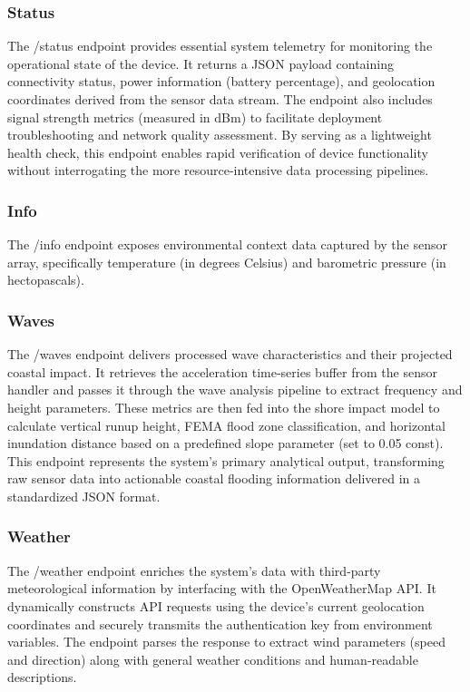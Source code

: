 \documentclass{article}
\begin{document}
    \subsubsection{Status}
    The /status endpoint provides essential system telemetry for monitoring the operational state of the device. It returns a JSON payload containing connectivity status, power information (battery percentage), and geolocation coordinates derived from the sensor data stream. The endpoint also includes signal strength metrics (measured in dBm) to facilitate deployment troubleshooting and network quality assessment. By serving as a lightweight health check, this endpoint enables rapid verification of device functionality without interrogating the more resource-intensive data processing pipelines.

    \subsubsection{Info}
    The /info endpoint exposes environmental context data captured by the sensor array, specifically temperature (in degrees Celsius) and barometric pressure (in hectopascals).

    \subsubsection{Waves}
    The /waves endpoint delivers processed wave characteristics and their projected coastal impact. It retrieves the acceleration time-series buffer from the sensor handler and passes it through the wave analysis pipeline to extract frequency and height parameters. These metrics are then fed into the shore impact model to calculate vertical runup height, FEMA flood zone classification, and horizontal inundation distance based on a predefined slope parameter (set to 0.05 const). This endpoint represents the system's primary analytical output, transforming raw sensor data into actionable coastal flooding information delivered in a standardized JSON format.

    \subsubsection{Weather}
    The /weather endpoint enriches the system's data with third-party meteorological information by interfacing with the OpenWeatherMap API. It dynamically constructs API requests using the device's current geolocation coordinates and securely transmits the authentication key from environment variables. The endpoint parses the response to extract wind parameters (speed and direction) along with general weather conditions and human-readable descriptions.
\end{document}
